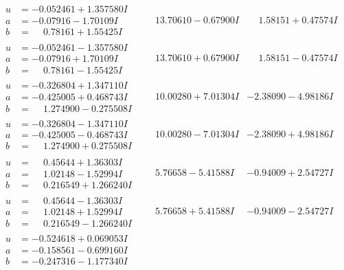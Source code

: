 \documentclass[1p]{elsarticle_modified}
\theoremstyle{definition}
\begin{document}
$$\begin{array}{c|c|c}
\begin{aligned}
u &= -0.052461 + 1.357580 I \\
a &= -0.07916 - 1.70109 I \\
b &= \phantom{-}0.78161 + 1.55425 I\end{aligned}
 & \phantom{-}13.70610 - 0.67900 I & \phantom{-}1.58151 + 0.47574 I \\ \hline\begin{aligned}
u &= -0.052461 - 1.357580 I \\
a &= -0.07916 + 1.70109 I \\
b &= \phantom{-}0.78161 - 1.55425 I\end{aligned}
 & \phantom{-}13.70610 + 0.67900 I & \phantom{-}1.58151 - 0.47574 I \\ \hline\begin{aligned}
u &= -0.326804 + 1.347110 I \\
a &= -0.425005 + 0.468743 I \\
b &= \phantom{-}1.274900 - 0.275508 I\end{aligned}
 & \phantom{-}10.00280 + 7.01304 I & -2.38090 - 4.98186 I \\ \hline\begin{aligned}
u &= -0.326804 - 1.347110 I \\
a &= -0.425005 - 0.468743 I \\
b &= \phantom{-}1.274900 + 0.275508 I\end{aligned}
 & \phantom{-}10.00280 - 7.01304 I & -2.38090 + 4.98186 I \\ \hline\begin{aligned}
u &= \phantom{-}0.45644 + 1.36303 I \\
a &= \phantom{-}1.02148 - 1.52994 I \\
b &= \phantom{-}0.216549 + 1.266240 I\end{aligned}
 & \phantom{-}5.76658 - 5.41588 I & -0.94009 + 2.54727 I \\ \hline\begin{aligned}
u &= \phantom{-}0.45644 - 1.36303 I \\
a &= \phantom{-}1.02148 + 1.52994 I \\
b &= \phantom{-}0.216549 - 1.266240 I\end{aligned}
 & \phantom{-}5.76658 + 5.41588 I & -0.94009 - 2.54727 I \\ \hline\begin{aligned}
u &= -0.524618 + 0.069053 I \\
a &= -0.158561 - 0.699160 I \\
b &= -0.247316 - 1.177340 I\end{aligned}

\end{array}$$
\end{document}
